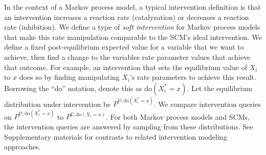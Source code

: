 \documentclass{article}
\def\todo#1{{\color{red}[#1]}}
\begin{document}
In the context of a Markov process model, a typical intervention definition is that an intervention increases a reaction rate (catalyzation) or decreases a reaction rate (inhibition). We define a type of {\it soft intervention} \cite{doi:10.1086/525638} for Markov process models that make this rate manipulation comparable to the SCM's ideal intervention.  We define a fixed post-equilibrium expected value for a variable that we want to achieve, then find a change to the variables rate parameter values that achieve that outcome.  For example, an intervention that sets the equilibrium value of $X_i$ to $x$ does so by finding manipulating $X_i$'s rate parameters to achieve this result. Borrowing the ``do'' notation, denote this as $\text{do}(X_i^* = x)$. Let the equilibrium distribution under intervention be $P^{\mathbb{M}; \text{do}(X_i^* = x)}$. We compare intervention queries on $P^{\mathbb{M}; \text{do}(X_i^* = x)}$ to $P^{\mathbb{C}; \text{do}(X_i = x)}$. For both Markov process models and SCMs, the intervention queries are answered by sampling from these distributions.  See Supplementary materials for contrasts to related intervention modeling approaches.

\end{document}
